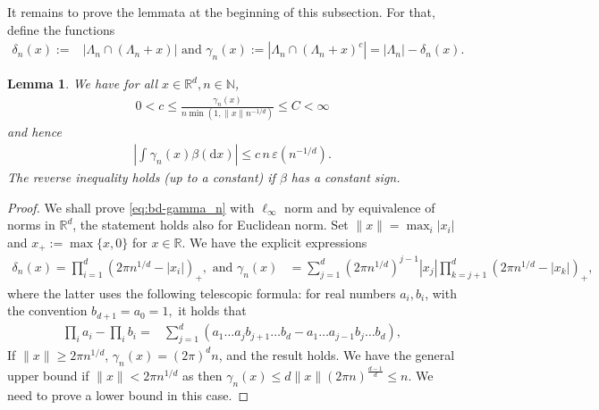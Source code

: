 \documentclass[12pt]{article}
\newtheorem{lemma}[theorem]{Lemma}
\newcommand{\R}{\mathbb{R}}
\newcommand{\1}{\mathbf{1}}
\newcommand{\md}{\mathrm{d}}
\begin{document}
{{{{{%

It remains to prove the lemmata at the beginning of this subsection. For that, define the functions
\begin{align*}
\delta _{n}(x) := & | \Lambda _{n}\cap (\Lambda _{n}+x) | \, \, \textrm{and} \, \,
\gamma _{n}(x) :=  | \Lambda _{n}\cap (\Lambda _{n}+x)^{c} | =  | \Lambda _{n} | -\delta _{n}(x).
\end{align*}

\begin{lemma}
\label{lm:gamma_n}
We have for all $x \in \R^d, n \in \mathbb{N}$,
\begin{align}
\label{eq:bd-gamma_n}
0<c\leqslant \frac{ \gamma _{n}(x) }{n\min(1,\|x\|n^{-1/d})}\leqslant C<\infty
\end{align}
and hence
\begin{align*}
 | \int_{}\gamma _{n}(x)\beta (\md x) | \leqslant   c \, n \, \varepsilon (n^{-1/d}).
\end{align*}
The reverse inequality holds (up to a constant) if $ \beta $ has a constant sign.
\end{lemma}


\begin{proof}  {We shall prove \eqref{eq:bd-gamma_n} with $\ell_{\infty}$ norm and by equivalence of norms in $\R^d$, the statement holds also for Euclidean norm. Set $ \|x\| = \max_{i} | x_{i} |$ and $x_+  := \max \{x,0\}$ for $x \in \R$.}
{We have the explicit expressions
%
\begin{align*}
\delta _{n}(x)= \prod_{i= 1}^{d}(2\pi n^{1/d}- | x_{i} | )_{+}, \, \, \text{and} \, \, \gamma _{n}(x)&
 = \sum_{j =  1}^{d}(2\pi n^{ 1/d})^{j- 1} | x_{j} |  \prod_{k = j +  1}^{d}(2\pi n^{ 1/d}- | x_{k} | )_+,
\end{align*}
%
where the latter uses the following telescopic formula: for real numbers $ a_{i},b_{i}$, with the convention $ b_{d +  1} = a_{0} =  1, $ it holds that
%
\begin{align*}  \prod_{i}a_{i}-  \prod_{i}b_{i} = &\sum_{j =   1}^{d}(a_{ 1}\dots a_{j}b_{j +  1 }\dots b_{d}-a_{ 1}\dots a_{j- 1 }b_{j}\dots b_{d}),
\end{align*}
%
}If $ \|x\|\geqslant 2\pi n^{ 1/d}$, $ \gamma  _{n}(x) = (2\pi )^{d}n$, and the result holds. We have the general upper bound if $ \|x\|<2\pi n^{ 1/d}$ as then $ \gamma _{n}(x)\leqslant {d}\|x\|(2\pi n)^{\frac{ d- 1}{d}}\leqslant n$. We need to prove a lower bound in this case.


\end{proof}}}}}}
\end{document}
